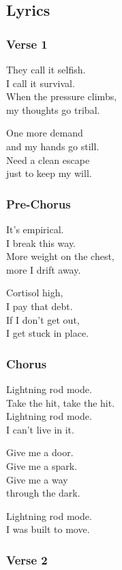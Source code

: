 \subsection{Lyrics}\label{lyrics-7}

\subsubsection{Verse 1}\label{verse-1-4}

They call it selfish.\\
I call it survival.\\
When the pressure climbs,\\
my thoughts go tribal.

One more demand\\
and my hands go still.\\
Need a clean escape\\
just to keep my will.

\subsubsection{Pre-Chorus}\label{pre-chorus-4}

It's empirical.\\
I break this way.\\
More weight on the chest,\\
more I drift away.

Cortisol high,\\
I pay that debt.\\
If I don't get out,\\
I get stuck in place.

\subsubsection{Chorus}\label{chorus-12}

Lightning rod mode.\\
Take the hit, take the hit.\\
Lightning rod mode.\\
I can't live in it.

Give me a door.\\
Give me a spark.\\
Give me a way\\
through the dark.

Lightning rod mode.\\
I was built to move.

\subsubsection{Verse 2}\label{verse-2-4}

